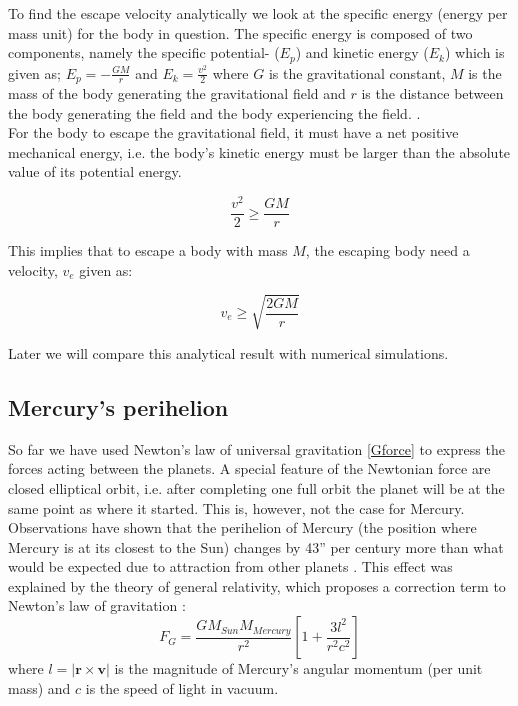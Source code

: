 \documentclass[12pt]{article}
\numberwithin{figure}{section}
\numberwithin{table}{section}
\begin{document}
\noindent To find the escape velocity analytically we look at the specific energy (energy per mass unit) for the body in question. The specific energy is composed of two components, namely the specific potential- ($E_p$) and kinetic energy ($E_k$) which is given as; $E_p = - \frac{GM}{r}$ and $E_k = \frac{v^2}{2}$ where $G$ is the gravitational constant, $M$ is the mass of the body generating the gravitational field and $r$ is the distance between the body generating the field and the body experiencing the field. \cite{VGS-FYS}.\\
For the body to escape the gravitational field, it must have a net positive mechanical energy, i.e. the body's kinetic energy must be larger than the absolute value of its potential energy. 

\begin{equation}
   \frac{v^2}{2}\geq \frac{GM}{r}
\end{equation}

\noindent This implies that to escape a body with mass $M$, the escaping body need a velocity, $v_e$ given as:

\begin{equation}
	\label{v_e}
		v_e \geqslant \sqrt{\frac{2GM}{r}}
\end{equation}

\noindent Later we will compare this analytical result with numerical simulations.


\subsection{Mercury's perihelion}
\noindent So far we have used Newton's law of universal gravitation \eqref{Gforce} to express the forces acting between the planets. A special feature of the Newtonian force \cite{pro3} are closed elliptical orbit, i.e. after completing one full orbit the planet will be at the same point as where it started. This is, however, not the case for Mercury. Observations have shown that the perihelion of Mercury (the position where Mercury is at its closest to the Sun) changes by 43'' per century more than what would be expected due to attraction from other planets \cite{pro3}. This effect was explained by the theory of general relativity, which proposes a correction term to Newton's law of gravitation \cite{pro3}:
\begin{equation}
   \label{GR}
   F_G = \frac{GM_{Sun}M_{Mercury}}{r^2}\left[1+\frac{3l^2}{r^2c^2}\right]
\end{equation}
where $l=|\mathbf{r}\times\mathbf{v}|$ is the magnitude of Mercury's angular momentum (per unit mass) and $c$ is the speed of light in vacuum. 
\end{document}
